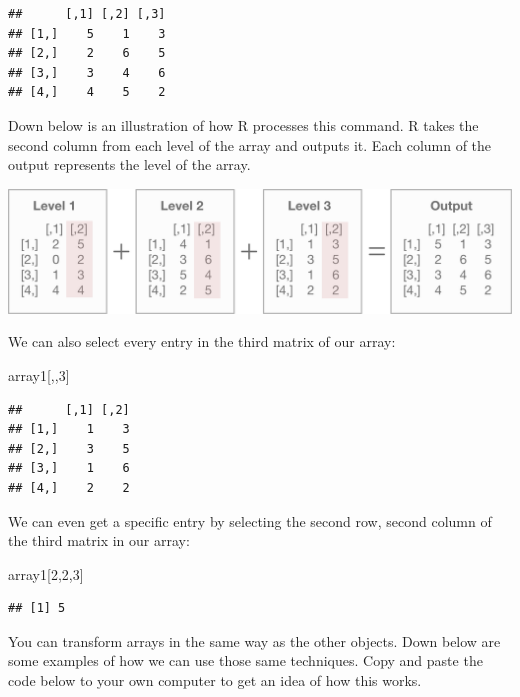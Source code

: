 \documentclass[
]{book}
\newenvironment{Shaded}{\begin{snugshade}}{\end{snugshade}}
\newcommand{\DecValTok}[1]{\textcolor[rgb]{0.00,0.00,0.81}{#1}}
\newcommand{\NormalTok}[1]{#1}
\begin{document}
\begin{center}
\begin{verbatim}
##      [,1] [,2] [,3]
## [1,]    5    1    3
## [2,]    2    6    5
## [3,]    3    4    6
## [4,]    4    5    2
\end{verbatim}

Down below is an illustration of how R processes this command. R takes the second column from each level of the array and outputs it. Each column of the output represents the level of the array.

\begin{center}\includegraphics[width=0.7\linewidth]{1.37.1_Array_Column_Selection} \end{center}

We can also select every entry in the third matrix of our array:

\begin{Shaded}
\begin{Highlighting}[]
\NormalTok{array1[,,}\DecValTok{3}\NormalTok{]}
\end{Highlighting}
\end{Shaded}

\begin{verbatim}
##      [,1] [,2]
## [1,]    1    3
## [2,]    3    5
## [3,]    1    6
## [4,]    2    2
\end{verbatim}

We can even get a specific entry by selecting the second row, second column of the third matrix in our array:

\begin{Shaded}
\begin{Highlighting}[]
\NormalTok{array1[}\DecValTok{2}\NormalTok{,}\DecValTok{2}\NormalTok{,}\DecValTok{3}\NormalTok{]}
\end{Highlighting}
\end{Shaded}

\begin{verbatim}
## [1] 5
\end{verbatim}

You can transform arrays in the same way as the other objects. Down below are some examples of how we can use those same techniques. Copy and paste the code below to your own computer to get an idea of how this works.


\end{center}
\end{document}
